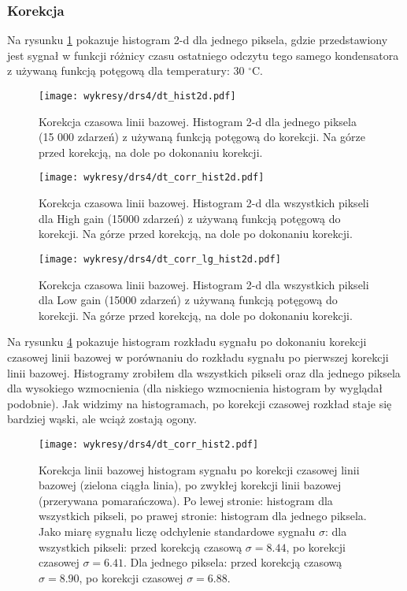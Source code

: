 \documentclass[a4paper,11pt,twoside]{article}
\begin{document}
\subsubsection{Korekcja}
Na rysunku \ref{fig:dt_corr_hist2d} pokazuje histogram 2-d dla jednego piksela, gdzie przedstawiony jest sygnał w funkcji różnicy czasu ostatniego odczytu tego samego kondensatora z używaną funkcją potęgową dla temperatury: 30 $^{\circ}$C. 
\begin{figure}[H] 
\centering
\texttt{[image: wykresy/drs4/dt\_hist2d.pdf]}
\caption{Korekcja czasowa linii bazowej. Histogram 2-d dla jednego piksela (15 000 zdarzeń) z używaną funkcją potęgową do korekcji. Na górze przed korekcją, na dole po dokonaniu korekcji.}
\label{fig:dt_corr_hist2d}
\end{figure}

\begin{figure}[H] 
\centering
\texttt{[image: wykresy/drs4/dt\_corr\_hist2d.pdf]}
\caption{Korekcja czasowa linii bazowej. Histogram 2-d dla wszystkich pikseli dla High gain (15000 zdarzeń) z używaną funkcją potęgową do korekcji. Na górze przed korekcją, na dole po dokonaniu korekcji.}
\label{fig:dt_corr_hist2d_all}
\end{figure}

\begin{figure}[H] 
\centering
\texttt{[image: wykresy/drs4/dt\_corr\_lg\_hist2d.pdf]}
\caption{Korekcja czasowa linii bazowej. Histogram 2-d dla wszystkich pikseli dla Low gain (15000 zdarzeń) z używaną funkcją potęgową do korekcji. Na górze przed korekcją, na dole po dokonaniu korekcji.}
\label{fig:dt_corr_hist2d_all}
\end{figure}

Na rysunku \ref{fig:dt_corr_hist} pokazuje histogram rozkładu sygnału po dokonaniu korekcji czasowej linii bazowej w porównaniu do rozkładu sygnału po pierwszej korekcji linii bazowej. Histogramy zrobiłem dla wszystkich pikseli oraz dla jednego piksela dla wysokiego wzmocnienia (dla niskiego wzmocnienia histogram by wyglądał podobnie). Jak widzimy na histogramach, po korekcji czasowej rozkład staje się bardziej wąski, ale wciąż zostają ogony.  
\begin{figure}[H] 
\centering
\texttt{[image: wykresy/drs4/dt\_corr\_hist2.pdf]}
\caption{Korekcja linii bazowej histogram sygnału po korekcji czasowej linii bazowej (zielona ciągła linia), po zwykłej korekcji linii bazowej (przerywana pomarańczowa). Po lewej stronie: histogram dla wszystkich pikseli, po prawej stronie: histogram dla jednego piksela. Jako miarę sygnału liczę odchylenie standardowe sygnału $\sigma$: dla wszystkich pikseli: przed korekcją czasową $\sigma = 8.44$, po korekcji czasowej $\sigma = 6.41$. Dla jednego piksela: przed korekcją czasową $\sigma = 8.90$, po korekcji czasowej $\sigma = 6.88$. }
\label{fig:dt_corr_hist}
\end{figure}
\newpage
\end{document}
